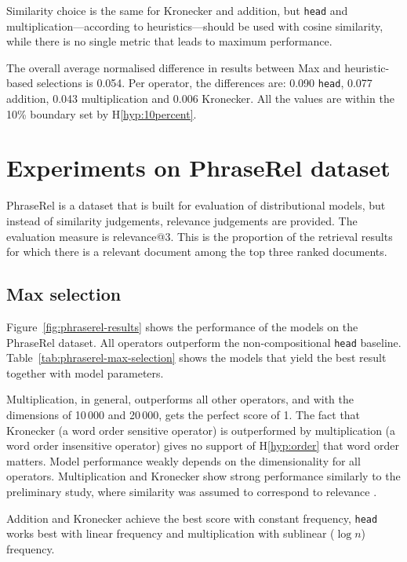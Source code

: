Similarity choice is the same for Kronecker and addition, but \texttt{head} and multiplication---according to heuristics---should be used with cosine similarity, while there is no single metric that leads to maximum performance.

The overall average normalised difference in results between Max and heuristic-based selections is 0.054. Per operator, the differences are: 0.090 \texttt{head}, 0.077 addition, 0.043 multiplication and 0.006 Kronecker. All the values are within the 10\% boundary set by H\ref{hyp:10percent}.

\section{Experiments on PhraseRel dataset}
\label{sec:phraserel-experiment}

PhraseRel is a dataset that is built for evaluation of distributional models, but instead of similarity judgements, relevance judgements are provided. The evaluation measure is relevance@3. This is the proportion of the retrieval results for which there is a relevant document among the top three ranked documents.

\subsection{Max selection}
\label{sec:max-selection-phraserel}



Figure~\ref{fig:phraserel-results} shows the performance of the models on the PhraseRel dataset. All operators outperform the non-compositional \texttt{head} baseline. Table~\ref{tab:phraserel-max-selection} shows the models that yield the best result together with model parameters.

Multiplication, in general, outperforms all other operators, and with the dimensions of 10\,000 and 20\,000, gets the perfect score of 1. The fact that Kronecker (a word order sensitive operator) is outperformed by multiplication (a word order insensitive operator) gives no support of H\ref{hyp:order} that word order matters. Model performance weakly depends on the dimensionality for all operators. Multiplication and Kronecker show strong performance similarly to the preliminary study, where similarity was assumed to correspond to relevance \cite{Milajevs:2015:IMN:2808194.2809448}.

Addition and Kronecker achieve the best score with constant frequency, \texttt{head} works best with linear frequency and multiplication with sublinear ($\log n$) frequency.

